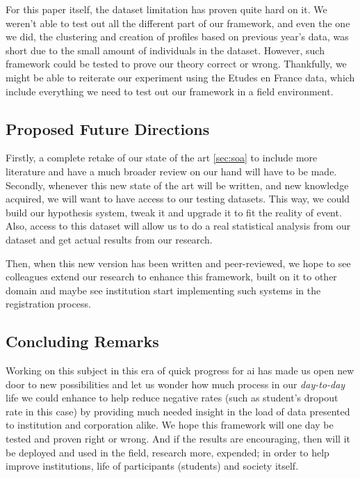 \documentclass[../main.tex]{subfiles}
\begin{document}
For this paper itself, the dataset limitation has proven quite hard on it. We weren't able to test out all the different part of our framework, and even the one we did, the clustering and creation of profiles based on previous year's data, was short due to the small amount of individuals in the dataset.
However, such framework could be tested to prove our theory correct or wrong.
Thankfully, we might be able to reiterate our experiment using the Etudes en France data, which include everything we need to test out our framework in a field environment.

\subsection{Proposed Future Directions}
Firstly, a complete retake of our state of the art \ref{sec:soa} to include more literature and have a much broader review on our hand will have to be made. 
Secondly, whenever this new state of the art will be written, and new knowledge acquired, we will want to have access to our testing datasets. This way, we could build our hypothesis system, tweak it and upgrade it to fit the reality of event. 
Also, access to this dataset will allow us to do a real statistical analysis from our dataset and get actual results from our research.

Then, when this new version has been written and peer-reviewed, we hope to see colleagues extend our research to enhance this framework, built on it to other domain and maybe see institution start implementing such systems in the registration process. 

\subsection{Concluding Remarks}
Working on this subject in this era of quick progress for \acrshort{ai} has made us open new door to new possibilities and let us wonder how much process in our \textit{day-to-day} life we could enhance to help reduce negative rates (such as student's dropout rate in this case) by providing much needed insight in the load of data presented to institution and corporation alike. 
We hope this framework will one day be tested and proven right or wrong. And if the results are encouraging, then will it be deployed and used in the field, research more, expended; in order to help improve institutions, life of participants (students) and society itself.
\end{document}
